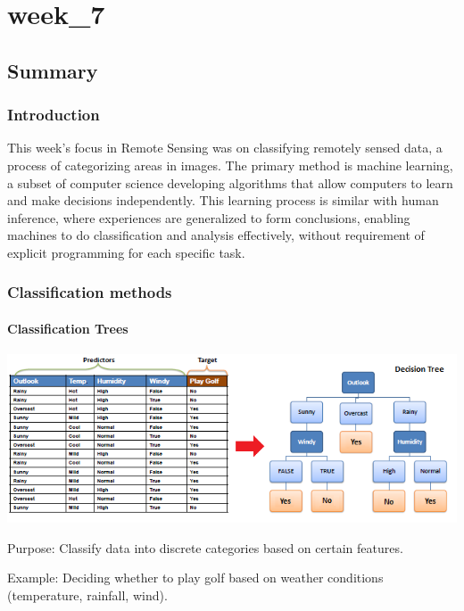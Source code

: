 \documentclass[
  letterpaper,
  DIV=11,
  numbers=noendperiod]{scrreprt}
\begin{document}
\chapter{week\_7}\label{week_7}

\section{Summary}\label{summary-1}

\subsection{Introduction}\label{introduction-2}

This week's focus in Remote Sensing was on classifying remotely sensed
data, a process of categorizing areas in images. The primary method is
machine learning, a subset of computer science developing algorithms
that allow computers to learn and make decisions independently. This
learning process is similar with human inference, where experiences are
generalized to form conclusions, enabling machines to do classification
and analysis effectively, without requirement of explicit programming
for each specific task.

\subsection{Classification methods}\label{classification-methods}

\subsubsection{Classification Trees}\label{classification-trees}

\includegraphics{classification tree.png}

Purpose: Classify data into discrete categories based on certain
features.

Example: Deciding whether to play golf based on weather conditions
(temperature, rainfall, wind).
\end{document}
